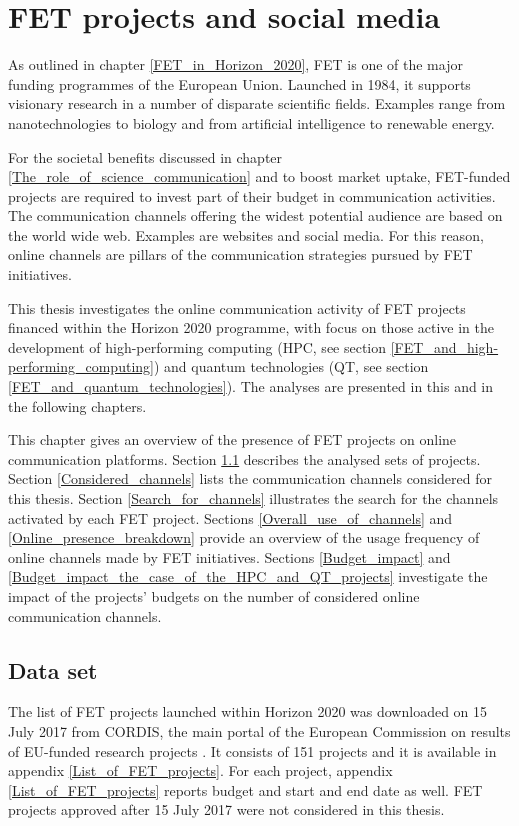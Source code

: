 \chapter{FET projects and social media} \label{FET_projects_and_social_media}
As outlined in chapter \ref{FET_in_Horizon_2020}, FET is one of the major funding programmes of the European Union. Launched in 1984, it supports visionary research in a number of disparate scientific fields. Examples range from nanotechnologies to biology and from artificial intelligence to renewable energy.

For the societal benefits discussed in chapter \ref{The_role_of_science_communication} and to boost market uptake, FET-funded projects are required to invest part of their budget in communication activities. The communication channels offering the widest potential audience are based on the world wide web. Examples are websites and social media. For this reason, online channels are pillars of the communication strategies pursued by FET initiatives. 

This thesis investigates the online communication activity of FET projects financed within the Horizon 2020 programme, with focus on those active in the development of high-performing computing (HPC, see section \ref{FET_and_high-performing_computing}) and quantum technologies (QT, see section \ref{FET_and_quantum_technologies}). The analyses are presented in this and in the following chapters.

This chapter gives an overview of the presence of FET projects on online communication platforms. Section \ref{Data_set} describes the analysed sets of projects. Section \ref{Considered_channels} lists the communication channels considered for this thesis. Section \ref{Search_for_channels} illustrates the search for the channels activated by each FET project. Sections \ref{Overall_use_of_channels} and \ref{Online_presence_breakdown} provide an overview of the usage frequency of online channels made by FET initiatives. Sections \ref{Budget_impact} and \ref{Budget_impact_the_case_of_the_HPC_and_QT_projects} investigate the impact of the projects' budgets on the number of considered online communication channels.

\section{Data set} \label{Data_set}
The list of FET projects launched within Horizon 2020 was downloaded on 15 July 2017 from CORDIS, the main portal of the European Commission on results of EU-funded research projects \cite{CORDIS}. It consists of 151 projects and it is available in appendix \ref{List_of_FET_projects}. For each project, appendix \ref{List_of_FET_projects} reports budget and start and end date as well. FET projects approved after 15 July 2017 were not considered in this thesis.

